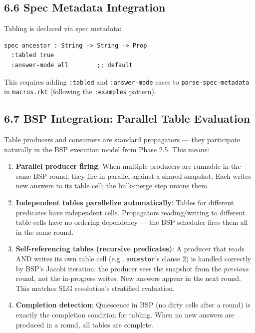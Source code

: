 \documentclass[11pt]{article}
\begin{document}
\subsection{6.6 Spec Metadata Integration}
\label{sec:org971fb9f}

Tabling is declared via spec metadata:

\begin{verbatim}
spec ancestor : String -> String -> Prop
  :tabled true
  :answer-mode all        ;; default
\end{verbatim}

This requires adding \texttt{:tabled} and \texttt{:answer-mode} cases to
\texttt{parse-spec-metadata} in \texttt{macros.rkt} (following the \texttt{:examples} pattern).
\subsection{6.7 BSP Integration: Parallel Table Evaluation}
\label{sec:org9d26f03}

Table producers and consumers are standard propagators — they participate
naturally in the BSP execution model from Phase 2.5. This means:

\begin{enumerate}
\item \textbf{Parallel producer firing}: When multiple producers are runnable in the same
BSP round, they fire in parallel against a shared snapshot. Each writes
new answers to its table cell; the bulk-merge step unions them.

\item \textbf{Independent tables parallelize automatically}: Tables for different
predicates have independent cells. Propagators reading/writing to
different table cells have no ordering dependency — the BSP scheduler
fires them all in the same round.

\item \textbf{Self-referencing tables (recursive predicates)}: A producer that reads AND
writes its own table cell (e.g., \texttt{ancestor}'s clause 2) is handled
correctly by BSP's Jacobi iteration: the producer sees the snapshot from
the \emph{previous} round, not the in-progress writes. New answers appear in
the next round. This matches SLG resolution's stratified evaluation.

\item \textbf{Completion detection}: Quiescence in BSP (no dirty cells after a round)
is exactly the completion condition for tabling. When no new answers are
produced in a round, all tables are complete.
\end{enumerate}
\end{document}
